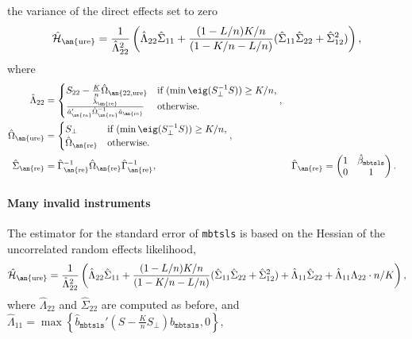 \documentclass{mynotes}
\newcommand{\h}[2]{\hat{#1}_{\text{\an{#2}}}} %
\begin{document}
    the variance of the direct effects set to zero \citep{kolesar12re}
    \begin{equation*}
      \h{\mathcal{H}}{ure}=
      \frac{1}{\hat{\Lambda}_{22}^{2}}\left(\hat{\Lambda}_{22}\hat{\Sigma}_{11}+
        \frac{(1-L/n )K/n}{(1-K/n-L/n)}
        (\hat{\Sigma}_{11}\hat{\Sigma}_{22}+\hat{\Sigma}_{12}^{2})    \right),
    \end{equation*}
where
\begin{align*}
  \hat{\Lambda}_{22}&= \begin{cases} S_{22}-\frac{K }{n}\h{\Omega}{22,ure} &
    \text{if $(\min\eig(S_{\perp}^{-1}S))\geq K/n$,} \\
    \frac{\h{\lambda}{re}}{\h{a}{re}'\h{\Omega}{re}^{-1}\h{a}{re}} &
    \text{otherwise.}
      \end{cases},\\
      \h{\Omega}{ure}&=\begin{cases}
        S_{\perp} & \text{if $(\min\eig(S_{\perp}^{-1}S))\geq K/n$,} \\
        \h{\Omega}{re} & \text{otherwise.}
      \end{cases},\\
      \h{\Sigma}{re} &= \h{\Gamma}{re}^{-1}\h{\Omega}{re}\h{\Gamma}{re}^{-1}, &
      \h{\Gamma}{re} &=\begin{pmatrix} 1& \hat{\beta}_{\mathtt{mbtsls}}\\
        0 &1
  \end{pmatrix}.
\end{align*}


\paragraph{Many invalid instruments}
The estimator for the standard error of \texttt{mbtsls} is based on the Hessian
of the uncorrelated random effects likelihood,
    \begin{equation*}
      \h{\mathcal{H}}{ure}=
      \frac{1}{\hat{\Lambda}_{22}^{2}}\left(\hat{\Lambda}_{22}\hat{\Sigma}_{11}+
        \frac{(1-L/n )K/n}{(1-K/n-L/n)}
        (\hat{\Sigma}_{11}\hat{\Sigma}_{22}+\hat{\Sigma}_{12}^{2})
        +\hat{\Lambda}_{11}\hat{\Sigma}_{22}+
        \hat{\Lambda}_{11}\Lambda_{22}\cdot n/K
      \right),
    \end{equation*}
    where $\hat{\Lambda}_{22}$ and $\hat{\Sigma}_{22}$ are computed as before,
    and $\hat{\Lambda}_{11}=\max\left\{\hat{b}_{\mathtt{mbtsls}}'(S-\frac{K
        }{n}S_{\perp}) \hat{b}_{\mathtt{mbtsls}} ,0\right\},$
\end{document}
